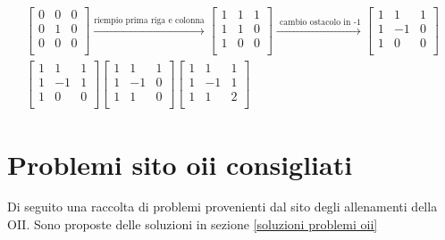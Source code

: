\begin{gather*}
	\begin{bmatrix}
		0 & 0 & 0 \\
		0 & 1 & 0 \\
		0 & 0 & 0 \\
	\end{bmatrix}
	\xrightarrow{\text{riempio prima riga e colonna}}
	\begin{bmatrix}
		1 & 1 & 1 \\
		1 & 1 & 0 \\
		1 & 0 & 0 \\
	\end{bmatrix}
	\xrightarrow{\text{ cambio ostacolo in -1}}
	\begin{bmatrix}
		1 & 1  & 1 \\
		1 & -1 & 0 \\
		1 & 0  & 0 \\
	\end{bmatrix}
	\\
	\begin{bmatrix}
		1 & 1  & 1 \\
		1 & -1 & 1 \\
		1 & 0  & 0 \\
	\end{bmatrix}
	\begin{bmatrix}
		1 & 1  & 1 \\
		1 & -1 & 0 \\
		1 & 1  & 0 \\
	\end{bmatrix}
	\begin{bmatrix}
		1 & 1  & 1 \\
		1 & -1 & 1 \\
		1 & 1  & 2 \\
	\end{bmatrix}
\end{gather*}



\section{Problemi sito oii consigliati}\label{problemi oii}
Di seguito una raccolta di problemi provenienti dal sito degli allenamenti della OII. Sono proposte delle soluzioni in sezione \cref{soluzioni problemi oii}

